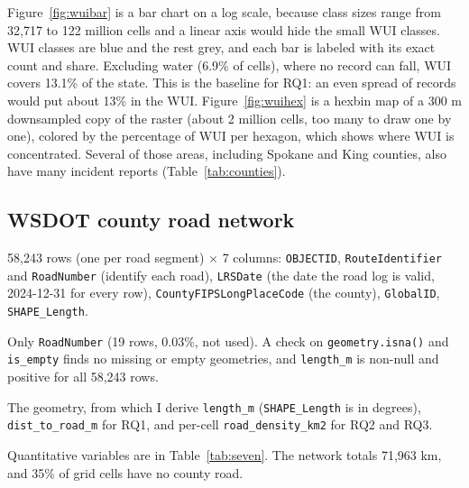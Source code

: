 \documentclass[11pt, a4paper]{article}
\begin{document}
Figure~\ref{fig:wuibar} is a bar chart on a log scale, because class sizes range from 32,717 to 122 million cells and a linear axis would hide the small WUI classes. WUI classes are blue and the rest grey, and each bar is labeled with its exact count and share. Excluding water (6.9\% of cells), where no record can fall, WUI covers 13.1\% of the state. This is the baseline for RQ1: an even spread of records would put about 13\% in the WUI. Figure~\ref{fig:wuihex} is a hexbin map of a 300 m downsampled copy of the raster (about 2 million cells, too many to draw one by one), colored by the percentage of WUI per hexagon, which shows where WUI is concentrated. Several of those areas, including Spokane and King counties, also have many incident reports (Table~\ref{tab:counties}).

\subsection{WSDOT county road network}
\begin{sloppypar}
  \begin{description}[leftmargin=0pt, itemsep=4pt]

    \item[Size:] 58,243 rows (one per road segment) $\times$ 7 columns:
      \texttt{OBJECTID}, \texttt{RouteIdentifier} and \texttt{RoadNumber} (identify each road),
      \texttt{LRSDate} (the date the road log is valid, 2024-12-31 for every row), \texttt{CountyFIPSLongPlaceCode} (the county), \texttt{GlobalID},
      \texttt{SHAPE\_Length}.

    \item[Missing:] Only \texttt{RoadNumber} (19 rows, 0.03\%, not used). A check on
      \texttt{geometry.isna()} and \texttt{is\_empty} finds no missing or empty geometries, and \texttt{length\_m} is non-null and positive for all
      58,243 rows.

    \item[Variables of interest:] The geometry, from which I derive
      \texttt{length\_m} (\texttt{SHAPE\_Length} is in degrees), \texttt{dist\_to\_road\_m} for RQ1, and per-cell \texttt{road\_density\_km2} for RQ2 and RQ3.

    \item[Summaries:] Quantitative variables are in Table~\ref{tab:seven}. The
      network totals 71,963 km, and 35\% of grid cells have no county road.

  \end{description}
\end{sloppypar}
\end{document}
